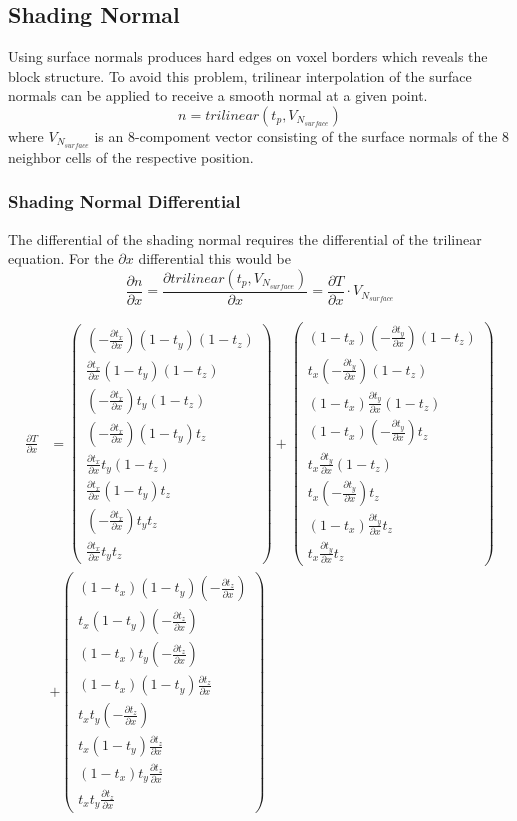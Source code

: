 \documentclass[12pt]{article}
\newcommand{\pardiffx}[1]{\frac{\partial #1}{\partial x} }
\newcommand{\newlinel}{\\[0.3em]}
\begin{document}
\subsection {Shading Normal}
Using surface normals produces hard edges on voxel borders which reveals the block structure. To avoid this problem, trilinear interpolation of the surface normals can be applied to receive a smooth normal at a given point.
\begin{equation}
n = trilinear(t_p, V_{N_{surface}})
\end{equation}
where $V_{N_{surface}}$ is an 8-compoment vector consisting of the surface normals of the 8 neighbor cells of the respective position.
\subsubsection {Shading Normal Differential}
The differential of the shading normal requires the differential of the trilinear equation. For the $\partial x$ differential this would be
\begin{equation}
\pardiffx{n} = \pardiffx{trilinear(t_p, V_{N_{surface}})} = \pardiffx{T} \cdot V_{N_{surface}}
\end{equation}

\begin{equation}
\begin{aligned}
\pardiffx{T} &=
\begin{pmatrix}
\left(-\pardiffx{t_x}\right) (1 - t_y) (1 - t_z) \newlinel
\pardiffx{t_x} (1 - t_y) (1 - t_z) \newlinel
\left(-\pardiffx{t_x}\right) t_y (1 - t_z) \newlinel
\left(-\pardiffx{t_x}\right) (1 - t_y) t_z \newlinel
\pardiffx{t_x} t_y (1 - t_z) \newlinel
\pardiffx{t_x} (1 - t_y) t_z \newlinel
\left(-\pardiffx{t_x}\right) t_y t_z \newlinel
\pardiffx{t_x} t_y t_z
\end{pmatrix}
+
\begin{pmatrix}
(1 - t_x) \left(-\pardiffx{t_y}\right) (1 - t_z) \newlinel
t_x \left(-\pardiffx{t_y}\right) (1 - t_z) \newlinel
(1 - t_x) \pardiffx{t_y} (1 - t_z) \newlinel
(1 - t_x) \left(-\pardiffx{t_y}\right) t_z \newlinel
t_x \pardiffx{t_y} (1 - t_z) \newlinel
t_x \left(-\pardiffx{t_y}\right) t_z \newlinel
(1 - t_x) \pardiffx{t_y} t_z \newlinel
t_x \pardiffx{t_y} t_z
\end{pmatrix}
\\
&+
\begin{pmatrix}
(1 - t_x) (1 - t_y) \left(-\pardiffx{t_z}\right) \newlinel
t_x (1 - t_y) \left(-\pardiffx{t_z}\right) \newlinel
(1 - t_x) t_y \left(-\pardiffx{t_z}\right) \newlinel
(1 - t_x) (1 - t_y) \pardiffx{t_z} \newlinel
t_x t_y \left(-\pardiffx{t_z}\right) \newlinel
t_x (1 - t_y) \pardiffx{t_z} \newlinel
(1 - t_x) t_y \pardiffx{t_z} \newlinel
t_x t_y \pardiffx{t_z}
\end{pmatrix}
\end{aligned}
\end{equation}
\end{document}
